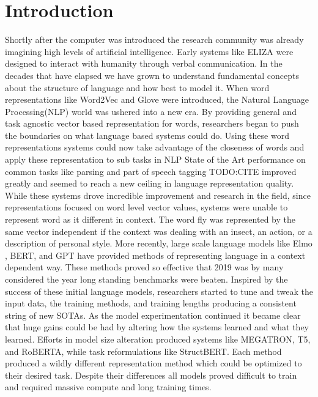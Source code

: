 \documentclass [11pt, proquest] {uwthesis}[2020/08/20]
\begin{document}
\chapter {Introduction}
Shortly after the computer was introduced the research community was already imagining high levels of artificial intelligence. Early systems like ELIZA \cite{Weizenbaum1966ELIZAA} were designed to interact with humanity through verbal communication. In the decades that have elapsed we have grown to understand fundamental concepts about the structure of language and how best to model it. When word representations like Word2Vec \cite{Mikolov2013EfficientEO} and Glove \cite{Pennington2014GloveGV} were introduced, the Natural Language Processing(NLP) world was ushered into a new era. By providing general and task agnostic vector based representation for words, researchers began to push the boundaries on what language based systems could do. Using these word representations systems could now take advantage of the closeness of words and apply these representation to sub tasks in NLP State of the Art performance on common tasks like parsing and part of speech tagging TODO:CITE improved greatly and seemed to reach a new ceiling in language representation quality. \\ While these systems drove incredible improvement and research in the field, since representations focused on word level vector values, systems were unable to represent word as it different in context. The word fly was represented by the same vector independent if the context was dealing with an insect, an action, or a description of personal style. More recently, large scale language models like Elmo \cite{Peters2018DeepCW}, BERT, and GPT have provided methods of representing language in a context dependent way. These methods proved so effective that 2019 was by many considered the year long standing benchmarks were beaten. Inspired by the success of these initial language models, researchers started to tune and tweak the input data, the training methods, and training lengths producing a consistent string of new SOTAs. As the model experimentation continued it became clear that huge gains could be had by altering how the systems learned and what they learned. Efforts in model size alteration produced systems like MEGATRON, T5, and RoBERTA, while task reformulations like StructBERT. Each method produced a wildly different representation method which could be optimized to their desired task. Despite their differences all models proved difficult to train and required massive compute and long training times.   \\
\end{document}
